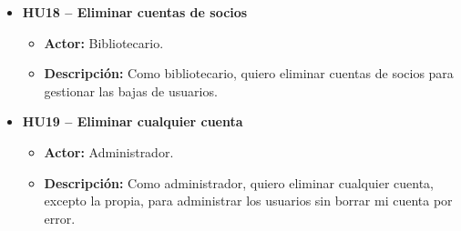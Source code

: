 \begin{itemize}
	\item \textbf{HU18 -- Eliminar cuentas de socios}
	\begin{itemize}
		\item \textbf{Actor:} Bibliotecario.
		\item \textbf{Descripción:} Como bibliotecario, quiero eliminar cuentas de socios para gestionar las bajas de usuarios.
	\end{itemize}
	
	\item \textbf{HU19 -- Eliminar cualquier cuenta}
	\begin{itemize}
		\item \textbf{Actor:} Administrador.
		\item \textbf{Descripción:} Como administrador, quiero eliminar cualquier cuenta, excepto la propia, para administrar los usuarios sin borrar mi cuenta por error.
	\end{itemize}
\end{itemize}

